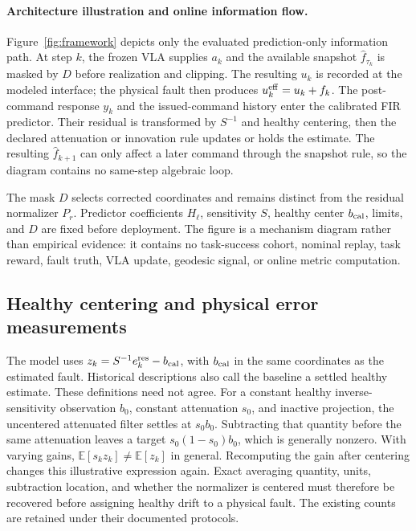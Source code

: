 \paragraph{Architecture illustration and online information flow.}
\label{app:figure-record}
Figure~\ref{fig:framework} depicts only the evaluated prediction-only
information path. At step $k$, the frozen VLA supplies $a_k$ and the available
snapshot $\widehat f_{\tau_k}$ is masked by $D$ before realization and clipping.
The resulting $u_k$ is recorded at the modeled interface; the physical fault
then produces $u_k^{\rm eff}=u_k+f_k$. The post-command response $y_k$ and the
issued-command history enter the calibrated FIR predictor. Their residual is
transformed by $S^{-1}$ and healthy centering, then the declared attenuation
or innovation rule updates or holds the estimate. The resulting
$\widehat f_{k+1}$ can only affect a later command through the snapshot rule,
so the diagram contains no same-step algebraic loop.

The mask $D$ selects corrected coordinates and remains distinct from the
residual normalizer $P_r$. Predictor coefficients $H_\ell$, sensitivity $S$,
healthy center $b_{\rm cal}$, limits, and $D$ are fixed before deployment.
The figure is a mechanism diagram rather than empirical evidence: it contains
no task-success cohort, nominal replay, task reward, fault truth, VLA update,
geodesic signal, or online metric computation.

\subsection{Healthy centering and physical error measurements}
\label{app:centering}
The model uses $z_k=S^{-1}e_k^{\rm res}-b_{\rm cal}$, with $b_{\rm cal}$ in the
same coordinates as the estimated fault. Historical descriptions also call
the baseline a settled healthy estimate. These definitions need not agree.
For a constant healthy inverse-sensitivity observation $b_0$, constant
attenuation $s_0$, and inactive projection, the uncentered attenuated filter
settles at $s_0b_0$. Subtracting that quantity before the same attenuation
leaves a target $s_0(1-s_0)b_0$, which is generally nonzero. With varying
gains, $\mathbb E[s_kz_k]\ne\mathbb E[z_k]$ in general. Recomputing the gain
after centering changes this illustrative expression again. Exact averaging
quantity, units, subtraction location, and whether the normalizer is centered
must therefore be recovered before assigning healthy drift to a physical fault.
The existing counts are retained under their documented protocols.

